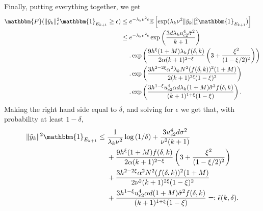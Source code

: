 \documentclass[letterpaper, 10 pt]{article}
\newcommand{\E}{\mathbb{E}}
\newcommand{\ty}{\tilde{y}}
\newcommand{\Prob}{\mathbbm{P}}
\begin{document}
Finally, putting everything together, we get
\begin{align*}
    \Prob(\|\ty_k\|^2_c \mathbbm{1}_{E_{k+1}} \geq \epsilon)&\leq e^{-\lambda_k\nu^2\epsilon} \E\left[ \exp(\lambda_k\nu^2 \|\ty_k\|^2_c \mathbbm{1}_{E_{k+1}}) \right]\\
    &\leq e^{-\lambda_k\nu^2\epsilon}\exp\left(\frac{3d\lambda_k u_{c2}^4\bar{\sigma}^2}{k+1}\right)  \\
    &\quad~. \exp\left( \frac{9h^\xi(1 +M)\lambda_k f(\delta,k)}{2\alpha (k+1)^{2-\xi}} \left( 3 +\frac{\xi^2}{(1-\xi/2)^2} \right) \right) \\
    &\quad~. \exp\left( \frac{3h^{2-2\xi}\alpha^2\lambda_k N^2(f(\delta,k))^2(1+M)}{2(k+1)^{2\xi}(1-\xi)^2}  \right)\\
    &\quad~.\exp \left(\frac{3h^{1-\xi}u_{c2}^4\alpha d\lambda_k(1+M)\hat{\sigma}^2f(\delta,k)}{(k+1)^{1+\xi}(1-\xi)} \right).
\end{align*}
Making the right hand side equal to $\delta$, and solving for $\epsilon$ we get that, with probability at least $1-\delta$,
\begin{align}
    \|\ty_k\|^2 \mathbbm{1}_{E_{k+1}} &\leq \frac{1}{\lambda_k\nu^2}\log\left(1/\delta\right) + \frac{3u_{c2}^4d \bar{\sigma}^2}{\nu^2(k+1)} \nonumber\\
    &\quad~+ \frac{9 h^\xi(1+M) f(\delta,k)}{2\alpha (k+1)^{2-\xi}} \left( 3 +\frac{\xi^2}{(1-\xi/2)^2} \right) \nonumber\\
    &\quad~+ \frac{3h^{2-2\xi}\alpha^2 N^2 (f(\delta,k))^2(1+M)}{2\nu^2(k+1)^{2\xi}(1-\xi)^2} \nonumber\\
    &\quad~+ \frac{3h^{1-\xi}u_{c2}^4\alpha d(1+M)\hat{\sigma}^2f(\delta,k)}{(k+1)^{1+\xi}(1-\xi)} =: \tilde{\epsilon}(k,\delta).\label{eq:epsilon_tilde_bound}
\end{align}
\end{document}
